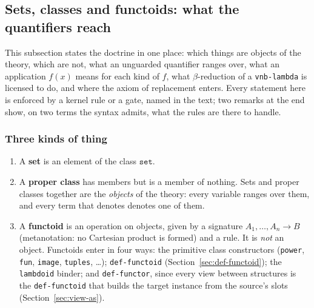 
\subsection{Sets, classes and functoids: what the quantifiers reach}
\label{sec:functoids-doctrine}
\label{rem:functoids-quantified}

This subsection states the doctrine in one place: which things are objects of
the theory, which are not, what an unguarded quantifier ranges over, what an
application $f(x)$ means for each kind of $f$, what $\beta$-reduction of a
\texttt{vnb-lambda} is licensed to do, and where the axiom of replacement
enters.  Every statement here is enforced by a kernel rule or a gate, named
in the text; two remarks at the end show, on two terms the syntax admits,
what the rules are there to handle.

\subsubsection{Three kinds of thing}

\begin{enumerate}
\item A \textbf{set} is an element of the class $\mathtt{set}$.
\item A \textbf{proper class} has members but is a member of nothing.
  Sets and proper classes together are the \emph{objects} of the theory:
  every variable ranges over them, and every term that denotes denotes one
  of them.
\item A \textbf{functoid} is an operation on objects, given by a signature
  $A_1, \ldots, A_n \to B$ (metanotation: no Cartesian product is formed)
  and a rule.  It is \emph{not} an object.  Functoids enter in four ways:
  the primitive class constructors (\texttt{power}, \texttt{fun},
  \texttt{image}, \texttt{tuples}, \ldots); \texttt{def-functoid}
  (Section~\ref{sec:def-functoid}); the \texttt{lambdoid} binder; and
  \texttt{def-functor}, since every view between structures is the
  \texttt{def-functoid} that builds the target instance from the source's
  slots (Section~\ref{sec:view-as}).
\end{enumerate}

